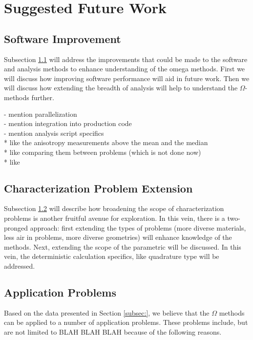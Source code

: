 \section{Suggested Future Work}
\label{sec:futurewrk}

\subsection{Software Improvement}
\label{subsec:softwareimp}

Subsection \ref{subsec:softwareimp} will address the improvements that could be
made to the software and analysis methods to enhance understanding of the omega
methods. First we will discuss how improving software performance will aid in
future work. Then we will discuss how extending the breadth of analysis will
help to understand the $\Omega$-methods further.

- mention parallelization \\
- mention integration into production code \\
- mention analysis script specifics \\
* like the anisotropy measurements above the mean and the median \\
* like comparing them between problems (which is not done now) \\
* like

\subsection{Characterization Problem Extension}
\label{subsec:extendcharprobs}

Subsection \ref{subsec:extendcharprobs} will describe how broadening the scope
of characterization problems is another fruitful avenue for exploration. In this
vein, there is a two-pronged approach: first extending the types of problems
(more diverse materials, less air in problems, more diverse geometries) will
enhance knowledge of the methods. Next, extending the scope of the parametric
will be discussed. In this vein, the deterministic calculation specifics, like
quadrature type will be addressed.


\subsection{Application Problems}
\label{subsec:appprobs}

Based on the data presented in Section \ref{subsec:}, we believe that the
$\Omega$ methods can be applied to a number of application problems. These
problems include, but are not limited to BLAH BLAH BLAH because of the following reasons.
